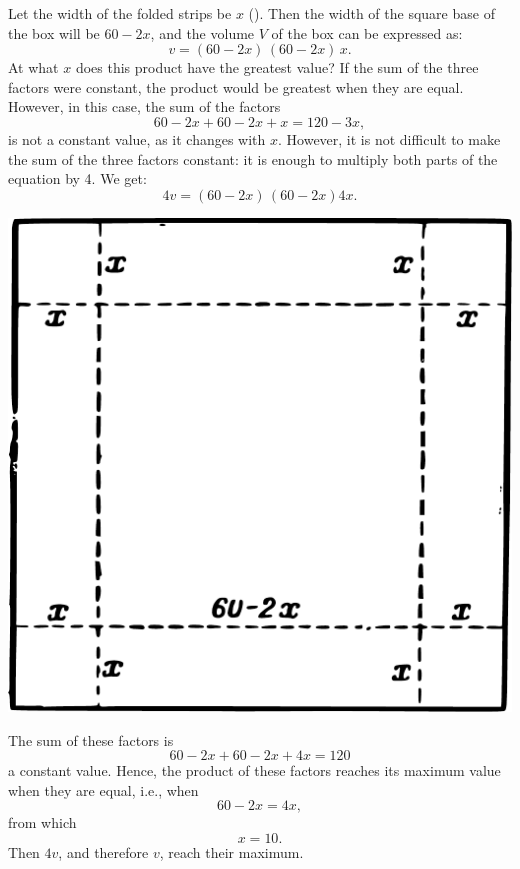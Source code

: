 \ans Let the width of the folded strips be $x$ (). Then the width of the square base of the box will be $60 - 2x$, and the volume $V$ of the box can be expressed as:
\begin{equation*}%
v = (60 - 2x)\,(60 - 2x)\, x.
\end{equation*}
At what $x$ does this product have the greatest value? If the sum of the three factors were constant, the product would be greatest when they are equal. However, in this case, the sum of the factors
\begin{equation*}%
60 - 2x + 60 - 2x + x = 120 - 3x,
\end{equation*}
is not a constant value, as it changes with $x$. However, it is not difficult to make the sum of the three factors constant: it is enough to multiply both parts of the equation by 4. We get:
\begin{equation*}%
4v = (60 - 2x)\,	(60 - 2x)4x.
\end{equation*}
\begin{marginfigure}%
\centering
\includegraphics[width=\textwidth]{figures/ch-12/fig-184.pdf}
\end{marginfigure}
The sum of these factors is
\begin{equation*}%
60 - 2x + 60 - 2x + 4x = 120
\end{equation*}
a constant value. Hence, the product of these factors reaches its maximum value when they are equal, i.e., when
\begin{equation*}%
60 - 2x = 4x,
\end{equation*}
from which 
\begin{equation*}%
x = 10.
\end{equation*}
Then \(4v \), and therefore \(v \), reach their maximum.


